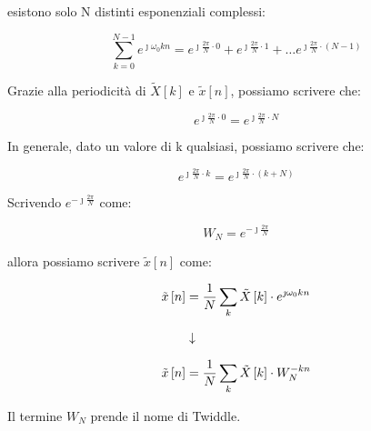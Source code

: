 esistono solo N distinti esponenziali complessi: 

{
    \Large 
    \begin{equation}
    \sum_{k = 0}^{N - 1}
    e^{\jmath \omega_0 k n} 
    = 
    e^{\jmath \frac{2 \pi}{N} \cdot 0}
    +
    e^{\jmath \frac{2 \pi}{N} \cdot 1}
    + 
    \dots 
    e^{\jmath \frac{2 \pi}{N} \cdot \left(N  - 1\right)}  
    \end{equation}
}

Grazie alla periodicità di $\tilde{X} \left[ k\right]$ e $\tilde{x} \left[ n\right]$, possiamo scrivere che: 

{
    \Large 
    \begin{equation}
        e^{\jmath \frac{2 \pi}{N} \cdot 0} 
        = 
        e^{\jmath \frac{2 \pi}{N} \cdot N}
    \end{equation}
}

In generale, dato un valore di k qualsiasi, possiamo scrivere che: 

{
    \Large 
    \begin{equation}
        e^{\jmath \frac{2 \pi}{N} \cdot k} 
        = 
        e^{\jmath \frac{2 \pi}{N} \cdot \left(k + N\right)}
    \end{equation}
}

\newpage 

Scrivendo $e^{- \jmath \frac{2 \pi}{N}}$ come: 

{
    \Large 
    \begin{equation}
        W_N = e^{- \jmath \frac{2 \pi}{N}}
    \end{equation}
}

allora possiamo scrivere $\tilde{x} \left[ n\right]$ come: 

{
    \Large 
    \begin{equation}
        \setlength{\jot}{10pt} %
        \begin{split}
        \tilde{x} \left[ n\right]
        &= 
        \dfrac{1}{N}
        \sum_{k}
        \tilde{X} \left[ k\right] \cdot e^{\jmath \omega_0 k n}
        \\
        &\downarrow
        \\
        \tilde{x} \left[ n\right]
        &= 
        \dfrac{1}{N}
        \sum_{k}
        \tilde{X} \left[ k\right] \cdot W_N^{-k n}
        \end{split}
    \end{equation}
}

Il termine $W_N$ prende il nome di Twiddle. \newline 

